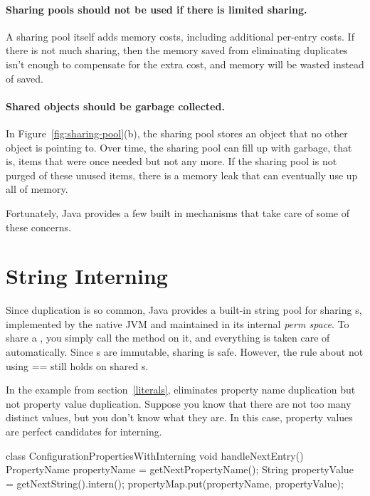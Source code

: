 \paragraph{Sharing pools should not be used if there is limited sharing.}
A sharing pool itself adds
memory costs, including additional per-entry costs. If there is not
much sharing, then the memory saved from
eliminating duplicates isn't enough to compensate for the
extra cost, and memory will be wasted instead of saved. 

\paragraph{Shared objects should be garbage collected.}
In Figure~\ref{fig:sharing-pool}(b), the sharing pool stores an object
that no other object is pointing to. Over time, the sharing pool can fill up
with garbage, that is, items that were once needed but not any more. If the
sharing pool is not purged of these unused items, there is a memory
leak that can eventually use up all of memory.

Fortunately, Java provides a few built in mechanisms that take care of some of
these concerns.

\section{String Interning}
\label{sec:sharing-strings}


 Since  duplication is so common, Java provides a built-in string
 pool for sharing s, implemented by the native JVM and maintained in
 its internal \emph{perm space}. To share a , you simply call the
 method  on it, and everything is taken care of automatically.
Since s are immutable, sharing is safe. However, the rule about
not using == still holds on shared s.
  
In the example from section~\ref{literals},
 eliminates property
name duplication but not
property value duplication. Suppose you know that there are
not too many distinct values, but you don't know what they are. In this case,
property values are perfect candidates for interning.
\begin{shortlisting}
 
 class ConfigurationPropertiesWithInterning {
    void handleNextEntry() {
       PropertyName propertyName = getNextPropertyName(); 
       String propertyValue = getNextString().intern();
       propertyMap.put(propertyName, propertyValue);
    }
}
\end{shortlisting}

